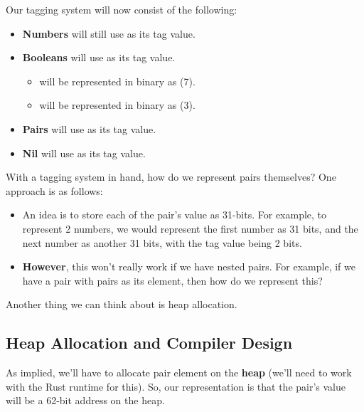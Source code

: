 \documentclass[letterpaper]{article}
\begin{document}
Our tagging system will now consist of the following:
\begin{itemize}
    \item \textbf{Numbers} will still use  as its tag value.
    \item \textbf{Booleans} will use  as its tag value. 
    \begin{itemize}
        \item {} will be represented in binary as  (7).
        \item {} will be represented in binary as  (3).
    \end{itemize}
    \item \textbf{Pairs} will use  as its tag value. 
    \item \textbf{Nil} will use  as its tag value.
\end{itemize}
With a tagging system in hand, how do we represent pairs themselves? One approach is as follows: 
\begin{itemize}
    \item An idea is to store each of the pair's value as 31-bits. For example, to represent 2 numbers, we would represent the first number as 31 bits, and the next number as another 31 bits, with the tag value being 2 bits. 
    \item \textbf{However}, this won't really work if we have nested pairs. For example, if we have a pair with pairs as its element, then how do we represent this? 
\end{itemize}
Another thing we can think about is heap allocation. 

\subsection{Heap Allocation and Compiler Design}
As implied, we'll have to allocate pair element on the \textbf{heap} (we'll need to work with the Rust runtime for this). So, our representation is that the pair's value will be a 62-bit address on the heap. 

\bigskip 
\end{document}
